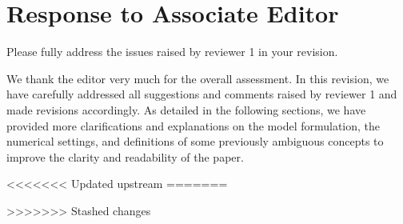 \hypertarget{Response to AE}{}
\section*{Response to Associate Editor}
\begin{revcomment}[AE.1]
	Please fully address the issues raised by reviewer 1 in your revision.
\end{revcomment}

\begin{revresponse}[AE.1]
	We thank the editor very much for the overall assessment. In this revision, we have carefully addressed all suggestions and comments raised by reviewer 1 and made revisions accordingly. As detailed in the following sections, we have provided more clarifications and explanations on the model formulation, the numerical settings, and definitions of some previously ambiguous concepts to improve the clarity and readability of the paper.
\end{revresponse}
<<<<<<< Updated upstream
=======

>>>>>>> Stashed changes
